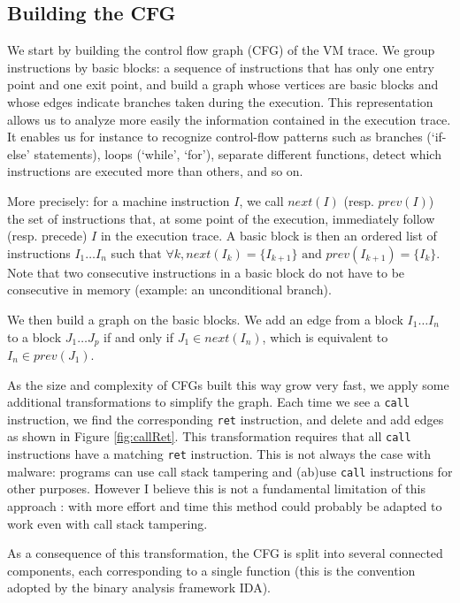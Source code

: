 \documentclass[english]{article}
\begin{document}
\subsection{Building the CFG}

We start by building the control flow graph (CFG) of the VM trace. We group instructions by basic blocks: a sequence of instructions that has only one entry point and one exit point, and build a graph whose vertices are basic blocks and whose edges indicate branches taken during the execution. This representation allows us to analyze more easily the information contained in the execution trace. It enables us for instance to recognize control-flow patterns such as branches (`if-else' statements), loops (`while', `for'), separate different functions, detect which instructions are executed more than others, and so on.

More precisely: for a machine instruction $I$, we call $next(I)$ (resp. $prev(I)$) the set of instructions that, at some point of the execution, immediately follow (resp. precede) $I$ in the execution trace. A basic block is then an ordered list of instructions $I_1 \dots I_n$ such that $\forall k, next(I_k) = \{I_{k+1}\} \textrm{ and } prev(I_{k+1}) = \{I_k\}$. Note that two consecutive instructions in a basic block do not have to be consecutive in memory (example: an unconditional branch). 

We then build a graph on the basic blocks. We add an edge from a block $I_1 \dots I_n$ to a block $J_1 \dots J_p$ if and only if $J_1 \in next(I_n)$, which is equivalent to $I_n \in prev(J_1)$.

As the size and complexity of CFGs built this way grow very fast, we apply some additional transformations to simplify the graph. Each time we see a \texttt{call} instruction, we find the corresponding \texttt{ret} instruction, and delete and add edges as shown in Figure \ref{fig:callRet}. This transformation requires that all \texttt{call} instructions have a matching \texttt{ret} instruction. This is not always the case with malware: programs can use call stack tampering and (ab)use \texttt{call} instructions for other purposes. However I believe this is not a fundamental limitation of this approach : with more effort and time this method could probably be adapted to work even with call stack tampering.

As a consequence of this transformation, the CFG is split into several connected components, each corresponding to a single function (this is the convention adopted by the binary analysis framework IDA).
\end{document}
